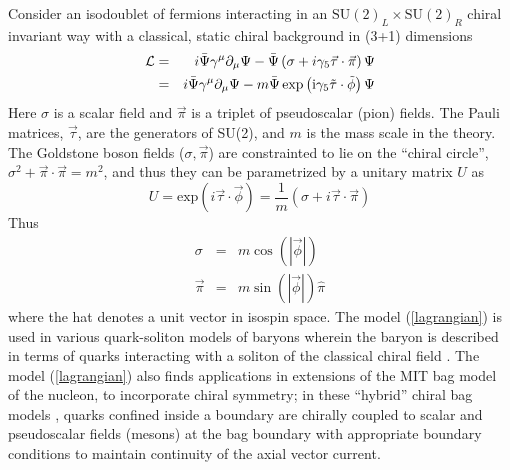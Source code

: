 \documentclass[a4paper,prd,showpacs,showkeys]{revtex4}
\begin{document}
Consider an isodoublet of fermions interacting in an $\textrm{SU}(2)_L \times \textrm{SU}(2)_R$ chiral invariant way with a classical, static chiral background in (3+1) dimensions
\begin{eqnarray}
\mathcal{L} &=& i \bar{\Psi} \gamma ^{\mu} \partial _{\mu} \Psi - \bar{\Psi} \left(\sigma + i \gamma _5 \vec{\tau} \cdot \vec{\pi} \right) \Psi \nonumber \\
&=& i \bar{\Psi} \gamma ^{\mu} \partial _{\mu} \Psi -m \bar{\Psi}\, \rm{exp} \left(i \gamma_5 \vec{\tau} \cdot \vec{\phi}\right)\Psi
\label{lagrangian}
\end{eqnarray}
Here $\sigma$ is a scalar field and $\vec{\pi}$ is a triplet of pseudoscalar (pion) fields. The Pauli matrices, $\vec{\tau}$, are the generators of SU(2), and $m$ is the mass scale in the theory. The Goldstone boson fields ($\sigma,\vec{\pi}$)  are  constrainted to lie on the ``chiral circle'',  $\sigma^2 +\vec{\pi} \cdot \vec{\pi} =m^2$, and thus they can be parametrized by a unitary matrix  $U$ as
\begin{equation}
U=\textrm{exp}\left(i \vec{\tau} \cdot \vec{\phi}\right)=\frac{1}{m}(\sigma +i \vec{\tau} \cdot \vec{\pi})
\label{unitary}
\end{equation}
Thus
\begin{eqnarray}
\sigma&=&m \cos (|\vec{\phi}|) \nonumber  \\
\vec{\pi}&=& m \sin (|\vec{\phi}|)\hat{\pi}
\label{phifield}
\end{eqnarray}
where the hat denotes a unit vector in isospin space.  The model (\ref{lagrangian}) is used in various quark-soliton models of baryons wherein the baryon is described in terms of quarks interacting with a soliton of the classical chiral field \cite{diakonov,ripka}. The model (\ref{lagrangian}) also finds applications in extensions of the MIT bag model of the nucleon, to incorporate chiral symmetry; in these ``hybrid'' chiral bag models \cite{jaffe,bhaduri},  quarks confined inside a boundary are chirally coupled to scalar and pseudoscalar fields (mesons) at the bag boundary with appropriate boundary conditions to maintain continuity of the axial vector current.
\end{document}
